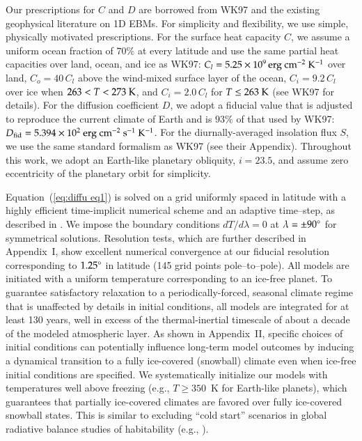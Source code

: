 Our prescriptions for $C$ and $D$ are borrowed from WK97 and the
existing geophysical literature on 1D EBMs. For simplicity and
flexibility, we use simple, physically motivated prescriptions.  For
the surface heat capacity $C$, we assume a uniform ocean fraction of
$70\%$ at every latitude and use the same partial heat capacities over
land, ocean, and ice as WK97: $C_l = 5.25 \times 10^9\,{\rm
erg~cm^{-2}~K^{-1}}$ over land, $C_o = 40\, C_l$ above the wind-mixed
surface layer of the ocean, $C_i = 9.2 \, C_l$ over ice when $263 < T
< 273 {\rm ~K}$, and $C_i = 2.0 \, C_l$ for $T \leq 263 {\rm~K}$ (see
WK97 for details).  For the diffusion coefficient $D$, we adopt a
fiducial value that is adjusted to reproduce the current climate of
Earth and is $93\%$ of that used by WK97: $D_{\rm fid} = 5.394\times
10^2 {\rm ~erg~cm^{-2}~s^{-1}~K^{-1}}$. For the diurnally-averaged
insolation flux $S$, we use the same standard formalism as WK97 (see
their Appendix).  Throughout this work, we adopt an Earth-like
planetary obliquity, $i=23.5$\degr, and assume zero eccentricity of
the planetary orbit for simplicity.

Equation~(\ref{eq:diffu eq1}) is solved on a grid uniformly spaced in
latitude with a highly efficient time-implicit numerical scheme and an
adaptive time--step, as described in \citet{hameury_et_al1998}. We
impose the boundary conditions $dT/d\lambda = 0$ at $\lambda = \pm
90\mbox{$^\circ$}$ for symmetrical solutions. Resolution tests, which are
further described in Appendix~I, show excellent numerical convergence
at our fiducial resolution corresponding to $1.25\mbox{$^\circ$}$ in latitude
(145 grid points pole--to--pole). All models are initiated with a
uniform temperature corresponding to an ice-free planet. To guarantee
satisfactory relaxation to a periodically-forced, seasonal climate
regime that is unaffected by details in initial conditions, all models
are integrated for at least 130 years, well in excess of the
thermal-inertial timescale of about a decade of the modeled
atmospheric layer. As shown in Appendix~II, specific choices of
initial conditions can potentially influence long-term model outcomes
by inducing a dynamical transition to a fully ice-covered (snowball)
climate even when ice-free initial conditions are specified. We
systematically initialize our models with temperatures well above
freezing (e.g., $T \geq 350$~K for Earth-like planets), which
guarantees that partially ice-covered climates are favored over fully
ice-covered snowball states. This is similar to excluding ``cold
start'' scenarios in global radiative balance studies of habitability
(e.g., \citealt{kasting_et_al1993}).

